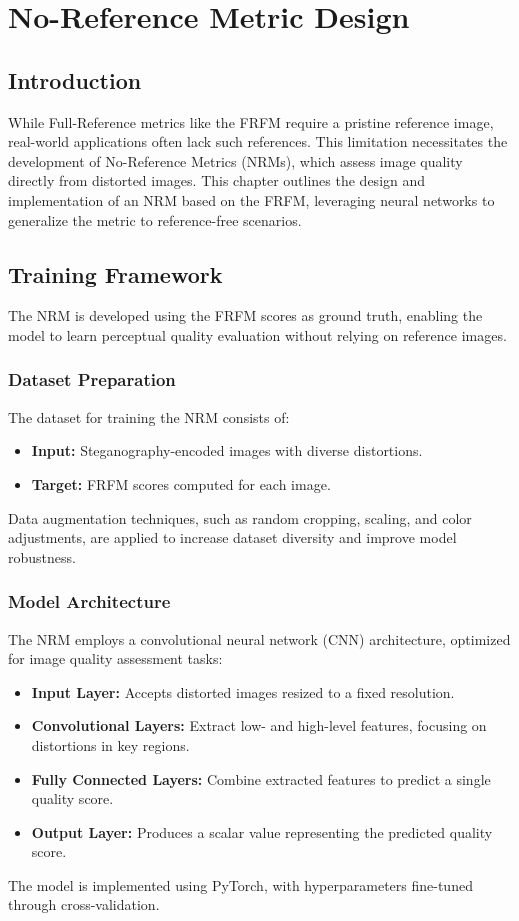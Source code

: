 \chapter{No-Reference Metric Design}

\section{Introduction}

While Full-Reference metrics like the FRFM require a pristine reference image, real-world applications often lack such references. This limitation necessitates the development of No-Reference Metrics (NRMs), which assess image quality directly from distorted images. This chapter outlines the design and implementation of an NRM based on the FRFM, leveraging neural networks to generalize the metric to reference-free scenarios.

\section{Training Framework}

The NRM is developed using the FRFM scores as ground truth, enabling the model to learn perceptual quality evaluation without relying on reference images.

\subsection{Dataset Preparation}

The dataset for training the NRM consists of:
\begin{itemize}
    \item \textbf{Input:} Steganography-encoded images with diverse distortions.
    \item \textbf{Target:} FRFM scores computed for each image.
\end{itemize}
Data augmentation techniques, such as random cropping, scaling, and color adjustments, are applied to increase dataset diversity and improve model robustness.

\subsection{Model Architecture}

The NRM employs a convolutional neural network (CNN) architecture, optimized for image quality assessment tasks:
\begin{itemize}
    \item \textbf{Input Layer:} Accepts distorted images resized to a fixed resolution.
    \item \textbf{Convolutional Layers:} Extract low- and high-level features, focusing on distortions in key regions.
    \item \textbf{Fully Connected Layers:} Combine extracted features to predict a single quality score.
    \item \textbf{Output Layer:} Produces a scalar value representing the predicted quality score.
\end{itemize}
The model is implemented using PyTorch, with hyperparameters fine-tuned through cross-validation.

